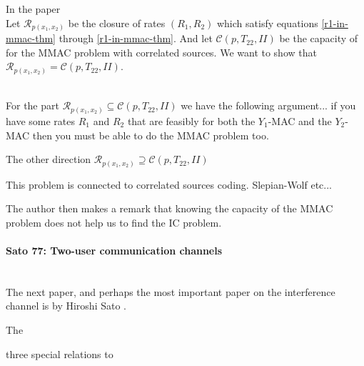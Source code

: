 \documentclass[aps,11pt,twoside,letterpaper]{article}
\theoremstyle{plain}
\theoremstyle{definition}
\begin{document}
        In the paper 
         \\
        Let $\mathcal{R}_{p(x_1,x_2)}$ be the closure  of rates $(R_1,R_2)$ which
        satisfy equations  \eqref{r1-in-mmac-thm} through \eqref{r1-in-mmac-thm}.
        And let $\mathcal{C}(p,T_{22},II)$ be the capacity of for the MMAC problem with correlated sources.
        We want to show that $\mathcal{R}_{p(x_1,x_2)} = \mathcal{C}(p,T_{22},II)$.



         \\
        For the part $\mathcal{R}_{p(x_1,x_2)} \subseteq \mathcal{C}(p,T_{22},II)$ we have the following argument...
        if you have some rates $R_1$ and $R_2$ that are feasibly for both the $Y_1$-MAC and the $Y_2$-MAC then
        you must be able to do the MMAC problem too.
        
        The other direction $\mathcal{R}_{p(x_1,x_2)} \supseteq \mathcal{C}(p,T_{22},II)$  



        This problem is connected to correlated sources coding. Slepian-Wolf etc...


        The author then makes a remark that knowing the capacity of the MMAC problem
        does not help us to find the IC problem.
        




        \paragraph{Sato 77: Two-user communication channels} \ \\

        The next paper, and perhaps the most important paper on the interference channel is
        by Hiroshi Sato \cite{Sato77}.

        The 
        
        three special relations to 
\end{document}
